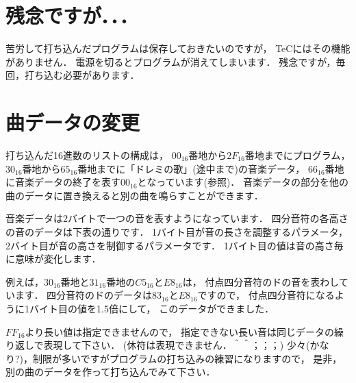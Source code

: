 \section{残念ですが．．．}
苦労して打ち込んだプログラムは保存しておきたいのですが，
TeCにはその機能がありません．
電源を切るとプログラムが消えてしまいます．
残念ですが，毎回，打ち込む必要があります．

\section{曲データの変更}
打ち込んだ16進数のリストの構成は，
$00_{16}$番地から$2F_{16}$番地までにプログラム，
$30_{16}$番地から$65_{16}$番地までに「ドレミの歌」(途中まで)の音楽データ，
$66_{16}$番地に音楽データの終了を表す$00_{16}$となっています(参照)．
音楽データの部分を他の曲のデータに置き換えると別の曲を鳴らすことができます．

音楽データは2バイトで一つの音を表すようになっています．
四分音符の各高さの音のデータは下表の通りです．
1バイト目が音の長さを調整するパラメータ，
2バイト目が音の高さを制御するパラメータです．
1バイト目の値は音の高さ毎に意味が変化します．

例えば，$30_{16}$番地と$31_{16}$番地の$C5_{16}$と$E8_{16}$は，
付点四分音符のドの音を表わしています．
四分音符のドのデータは$83_{16}$と$E8_{16}$ですので，
付点四分音符になるように1バイト目の値を1.5倍にして，
このデータができました．

$FF_{16}$より長い値は指定できませんので，
指定できない長い音は同じデータの繰り返しで表現して下さい．
(休符は表現できません．＾＾；；；)
少々(かなり?)，制限が多いですがプログラムの打ち込みの練習になりますので，
是非，別の曲のデータを作って打ち込んでみて下さい．

{\small
\begin{center}
\end{center}
}
